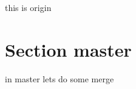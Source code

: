 \documentclass{article}
\begin{document}
    this is origin

    \section{Section master}
    in master
    lets do some merge
\end{document}
